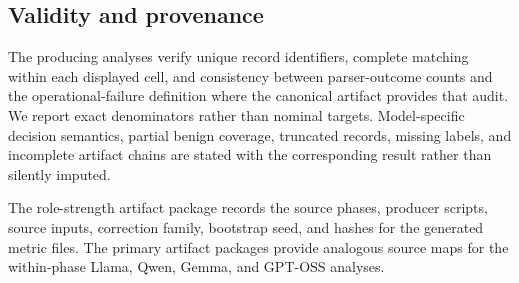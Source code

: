 \subsection{Validity and provenance}
The producing analyses verify unique record identifiers, complete matching within each displayed cell, and consistency between parser-outcome counts and the operational-failure definition where the canonical artifact provides that audit. We report exact denominators rather than nominal targets. Model-specific decision semantics, partial benign coverage, truncated records, missing labels, and incomplete artifact chains are stated with the corresponding result rather than silently imputed.

The role-strength artifact package records the source phases, producer scripts, source inputs, correction family, bootstrap seed, and hashes for the generated metric files. The primary artifact packages provide analogous source maps for the within-phase Llama, Qwen, Gemma, and GPT-OSS analyses.